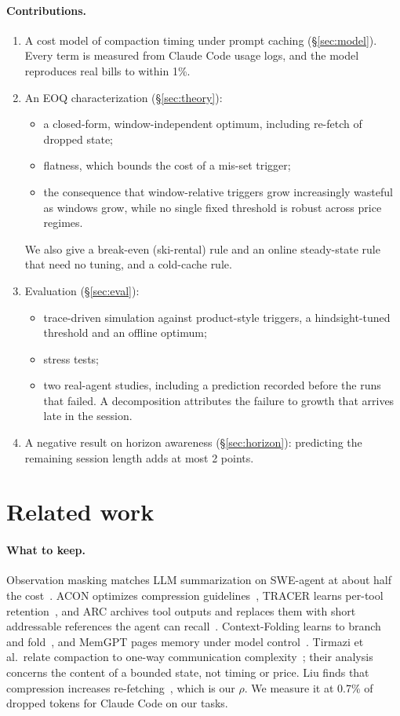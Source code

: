 \documentclass[11pt]{article}
\begin{document}
\paragraph{Contributions.}
\begin{enumerate}
\item A cost model of compaction timing under prompt caching (\S\ref{sec:model}). Every term is measured from Claude Code usage logs, and the model reproduces real bills to within 1\%.
\item An EOQ characterization (\S\ref{sec:theory}):
  \begin{itemize}
  \item a closed-form, window-independent optimum, including re-fetch of dropped state;
  \item flatness, which bounds the cost of a mis-set trigger;
  \item the consequence that window-relative triggers grow increasingly wasteful as windows grow, while no single fixed threshold is robust across price regimes.
  \end{itemize}
  We also give a break-even (ski-rental) rule and an online steady-state rule that need no tuning, and a cold-cache rule.
\item Evaluation (\S\ref{sec:eval}):
  \begin{itemize}
  \item trace-driven simulation against product-style triggers, a hindsight-tuned threshold and an offline optimum;
  \item stress tests;
  \item two real-agent studies, including a prediction recorded before the runs that failed. A decomposition attributes the failure to growth that arrives late in the session.
  \end{itemize}
\item A negative result on horizon awareness (\S\ref{sec:horizon}): predicting the remaining session length adds at most 2 points.
\end{enumerate}

\section{Related work}
\paragraph{What to keep.} Observation masking matches LLM summarization on SWE-agent at about half the cost~\cite{complexitytrap}. ACON optimizes compression guidelines~\cite{acon}, TRACER learns per-tool retention~\cite{tracer}, and ARC archives tool outputs and replaces them with short addressable references the agent can recall~\cite{arc}. Context-Folding learns to branch and fold~\cite{folding}, and MemGPT pages memory under model control~\cite{memgpt}. Tirmazi et al.\ relate compaction to one-way communication complexity~\cite{compactiontheory}; their analysis concerns the content of a bounded state, not timing or price. Liu finds that compression increases re-fetching~\cite{compresscost}, which is our $\rho$. We measure it at 0.7\% of dropped tokens for Claude Code on our tasks.
\end{document}
